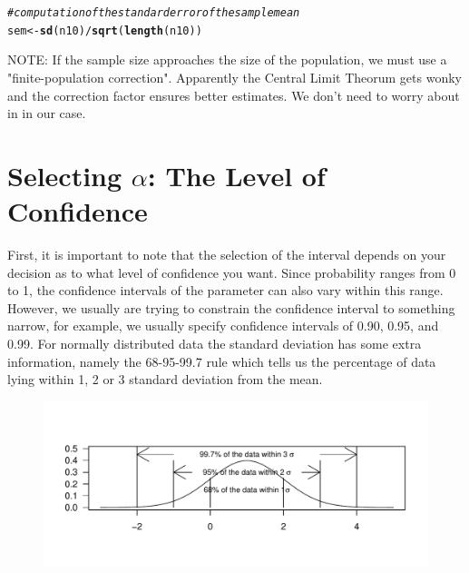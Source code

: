\documentclass{tufte-handout}\usepackage[]{graphicx}\usepackage[]{color}
\makeatletter
\def\maxwidth{ %
  \ifdim\Gin@nat@width>\linewidth
    \linewidth
  \else
    \Gin@nat@width
  \fi
}
\newcommand{\hlcom}[1]{\textcolor[rgb]{0.678,0.584,0.686}{\textit{#1}}}%
\newcommand{\hlopt}[1]{\textcolor[rgb]{0,0,0}{#1}}%
\newcommand{\hlstd}[1]{\textcolor[rgb]{0.345,0.345,0.345}{#1}}%
\newcommand{\hlkwb}[1]{\textcolor[rgb]{0.69,0.353,0.396}{#1}}%
\newcommand{\hlkwd}[1]{\textcolor[rgb]{0.737,0.353,0.396}{\textbf{#1}}}%
\newenvironment{kframe}{%
 \def\at@end@of@kframe{}%
 \ifinner\ifhmode%
  \def\at@end@of@kframe{\end{minipage}}%
  \begin{minipage}{\columnwidth}%
 \fi\fi%
 \def\FrameCommand##1{\hskip\@totalleftmargin \hskip-\fboxsep
 \colorbox{shadecolor}{##1}\hskip-\fboxsep
     \hskip-\linewidth \hskip-\@totalleftmargin \hskip\columnwidth}%
 \MakeFramed {\advance\hsize-\width
   \@totalleftmargin\z@ \linewidth\hsize
   \@setminipage}}%
 {\par\unskip\endMakeFramed%
 \at@end@of@kframe}
\newenvironment{knitrout}{}{} %
\makeatother
\begin{document}
\begin{knitrout}
\color{fgcolor}\begin{kframe}
\begin{alltt}
\hlcom{#computation of the standard error of the sample mean}
\hlstd{sem}\hlkwb{<-}\hlkwd{sd}\hlstd{(n10)}\hlopt{/}\hlkwd{sqrt}\hlstd{(}\hlkwd{length}\hlstd{(n10))}
\end{alltt}
\end{kframe}
\end{knitrout}

NOTE: If the sample size approaches the size of the population, we must use a "finite-population correction". Apparently the Central Limit Theorum gets wonky and the correction factor ensures better estimates. We don't need to worry about in in our case.


 
\section{Selecting $\alpha$: The Level of Confidence}

First, it is important to note that the selection of the interval depends on your decision as to what level of confidence you want. Since probability ranges from 0 to 1, the confidence intervals of the parameter can also vary within this range. However, we usually are trying to constrain the confidence interval to something narrow, for example, we usually specify confidence intervals of 0.90, 0.95, and 0.99. For normally distributed data the standard deviation has some extra information, namely the 68-95-99.7 rule which tells us the percentage of data lying within 1, 2 or 3 standard deviation from the mean.

\begin{figure}
\begin{knitrout}
\color{fgcolor}
\includegraphics[width=\maxwidth]{figure/unnamed-chunk-8-1} 

\end{knitrout}
\end{figure}
\end{document}
